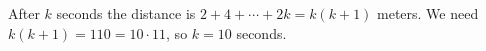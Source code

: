 After $k$ seconds the distance is $2+4+\cdots+2k=k(k+1)$ meters. We need $k(k+1)=110=10\cdot11$, so $k=\boxed{10}$ seconds.
